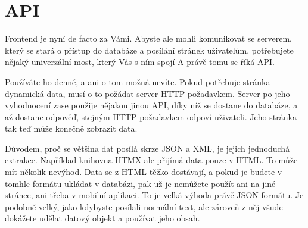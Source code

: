 \section{API}

Frontend je nyní de facto za Vámi. Abyste ale mohli komunikovat se serverem, který se stará o přístup do databáze a posílání stránek uživatelům, potřebujete nějaký univerzální most, který Vás s ním spojí A právě tomu se říká API\cite{WhatIsAPI}.

Používáte ho denně, a ani o tom možná nevíte. Pokud potřebuje stránka dynamická data, musí o to požádat server HTTP požadavkem. Server po jeho vyhodnocení zase použije nějakou jinou API, díky níž se dostane do databáze, a až dostane odpověď, stejným HTTP požadavkem odpoví uživateli. Jeho stránka tak teď může konečně zobrazit data.

Důvodem, proč se většina dat posílá skrze JSON a XML, je jejich jednoduchá extrakce. Například knihovna HTMX ale přijímá data pouze v HTML. To může mít několik nevýhod. Data se z HTML těžko dostávají, a pokud je budete v tomhle formátu ukládat v databázi, pak už je nemůžete použít ani na jiné stránce, ani třeba v mobilní aplikaci. To je velká výhoda právě JSON formátu. Je podobně velký, jako kdybyste posílali normální text, ale zároveň z něj všude dokážete udělat datový objekt a používat jeho obsah.